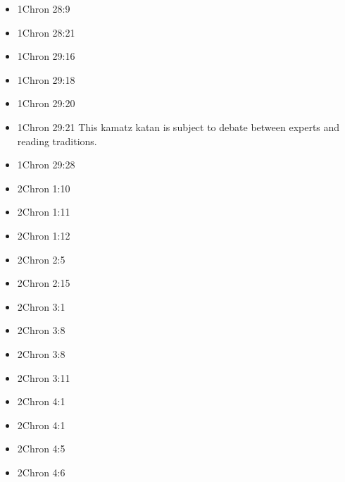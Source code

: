 \documentclass[14pt]{book}
\begin{document}
\begin{multicols}{2}
\begin{itemize}
						\item 1Chron 28:9
						
						\item 1Chron 28:21
						
						\item 1Chron 29:16
						
						\item 1Chron 29:18
						
						\item 1Chron 29:20
						
						\item 1Chron 29:21 This kamatz katan is subject to debate between experts and reading traditions.
						
						\item 1Chron 29:28
						
						\item 2Chron 1:10
						
						\item 2Chron 1:11
						
						\item 2Chron 1:12
						
						\item 2Chron 2:5
						
						\item 2Chron 2:15
						
						\item 2Chron 3:1
						
						\item 2Chron 3:8
						
						\item 2Chron 3:8
						
						\item 2Chron 3:11
						
						\item 2Chron 4:1
						
						\item 2Chron 4:1
						
						\item 2Chron 4:5
						
						\item 2Chron 4:6
						

\end{itemize}
\end{multicols}
\end{document}
